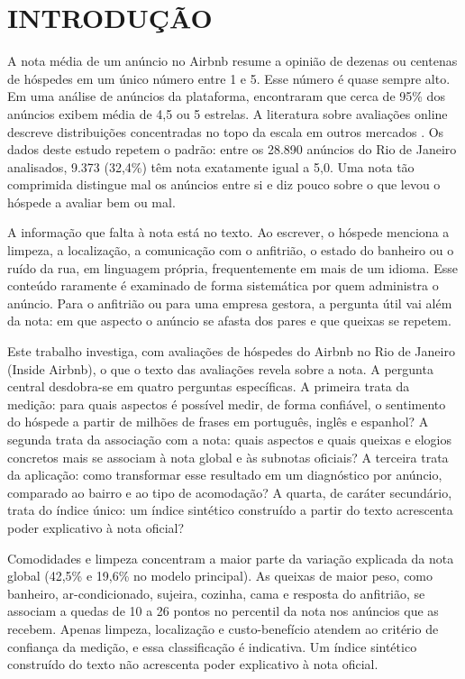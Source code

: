 \section{INTRODUÇÃO}

A nota média de um anúncio no Airbnb resume a opinião de dezenas ou centenas de hóspedes em um único número entre 1 e 5. Esse número é quase sempre alto. Em uma análise de anúncios da plataforma, \citet{zervas2021} encontraram que cerca de 95\% dos anúncios exibem média de 4,5 ou 5 estrelas. A literatura sobre avaliações online descreve distribuições concentradas no topo da escala em outros mercados \citep{hu2009,filippas2022}. Os dados deste estudo repetem o padrão: entre os 28.890 anúncios do Rio de Janeiro analisados, 9.373 (32,4\%) têm nota exatamente igual a 5,0. Uma nota tão comprimida distingue mal os anúncios entre si e diz pouco sobre o que levou o hóspede a avaliar bem ou mal.

A informação que falta à nota está no texto. Ao escrever, o hóspede menciona a limpeza, a localização, a comunicação com o anfitrião, o estado do banheiro ou o ruído da rua, em linguagem própria, frequentemente em mais de um idioma. Esse conteúdo raramente é examinado de forma sistemática por quem administra o anúncio. Para o anfitrião ou para uma empresa gestora, a pergunta útil vai além da nota: em que aspecto o anúncio se afasta dos pares e que queixas se repetem.

Este trabalho investiga, com avaliações de hóspedes do Airbnb no Rio de Janeiro (Inside Airbnb), o que o texto das avaliações revela sobre a nota. A pergunta central desdobra-se em quatro perguntas específicas. A primeira trata da medição: para quais aspectos é possível medir, de forma confiável, o sentimento do hóspede a partir de milhões de frases em português, inglês e espanhol? A segunda trata da associação com a nota: quais aspectos e quais queixas e elogios concretos mais se associam à nota global e às subnotas oficiais? A terceira trata da aplicação: como transformar esse resultado em um diagnóstico por anúncio, comparado ao bairro e ao tipo de acomodação? A quarta, de caráter secundário, trata do índice único: um índice sintético construído a partir do texto acrescenta poder explicativo à nota oficial?

Comodidades e limpeza concentram a maior parte da variação explicada da nota global (42,5\% e 19,6\% no modelo principal). As queixas de maior peso, como banheiro, ar-condicionado, sujeira, cozinha, cama e resposta do anfitrião, se associam a quedas de 10 a 26 pontos no percentil da nota nos anúncios que as recebem. Apenas limpeza, localização e custo-benefício atendem ao critério de confiança da medição, e essa classificação é indicativa. Um índice sintético construído do texto não acrescenta poder explicativo à nota oficial.

